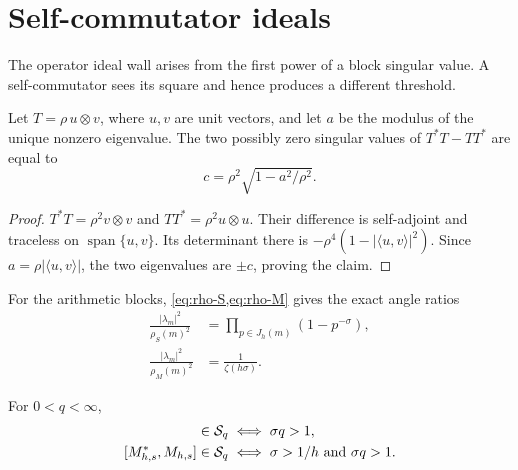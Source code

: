 \section{Self-commutator ideals}
\label{sec:commutators}

The operator ideal wall arises from the first power of a block singular
value.  A self-commutator sees its square and hence produces a different
threshold.

\begin{lemma}
\label{lem:rankone-commutator}
Let $T=\rho\,u\otimes v$, where $u,v$ are unit vectors, and let $a$ be the
modulus of the unique nonzero eigenvalue.  The two possibly zero singular
values of $T^*T-TT^*$ are equal to
\begin{equation}
  c=\rho^2\sqrt{1-a^2/\rho^2}.
  \label{eq:commutator-c}
\end{equation}
\end{lemma}

\begin{proof}
$T^*T=\rho^2v\otimes v$ and $TT^*=\rho^2u\otimes u$.  Their difference
is self-adjoint and traceless on $\operatorname{span}\{u,v\}$.  Its
determinant there is
$-\rho^4(1-|\langle u,v\rangle|^2)$.  Since
$a=\rho|\langle u,v\rangle|$, the two eigenvalues are $\pm c$, proving
the claim.
\end{proof}

For the arithmetic blocks, \cref{eq:rho-S,eq:rho-M} gives the exact angle
ratios
\begin{align}
  \frac{|\lambda_m|^2}{\rho_S(m)^2}
    &=\prod_{p\in J_h(m)}(1-p^{-\sigma}),
      \label{eq:S-angle}\\
  \frac{|\lambda_m|^2}{\rho_M(m)^2}
    &=\frac1{\zeta(h\sigma)}.
      \label{eq:M-angle}
\end{align}

\begin{theorem}
\label{thm:commutator-wall}
For $0<q<\infty$,
\begin{align*}
  [S_{h,s}^*,S_{h,s}]\in\Sq
    &\iff\sigma q>1,\\
  [M_{h,s}^*,M_{h,s}]\in\Sq
    &\iff\sigma>1/h\ \text{and}\ \sigma q>1.
\end{align*}
\end{theorem}

